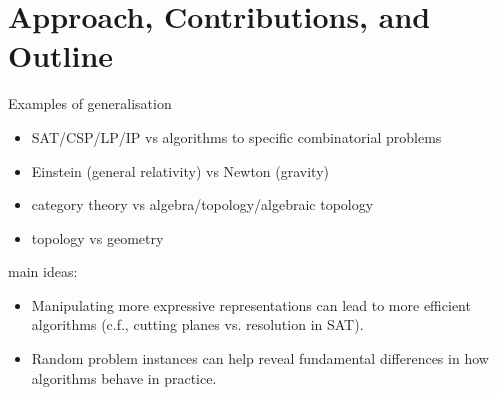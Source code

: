 
\section{Approach, Contributions, and Outline} %


Examples of generalisation
\begin{itemize}
\item SAT/CSP/LP/IP vs algorithms to specific combinatorial problems
\item Einstein (general relativity) vs Newton (gravity)
\item category theory vs algebra/topology/algebraic topology
\item topology vs geometry
\end{itemize}

main ideas:
\begin{itemize}
\item Manipulating more expressive representations can lead to more
  efficient algorithms (c.f., cutting planes vs. resolution in SAT).
\item Random problem instances can help reveal fundamental differences in
  how algorithms behave in practice.
\end{itemize}

